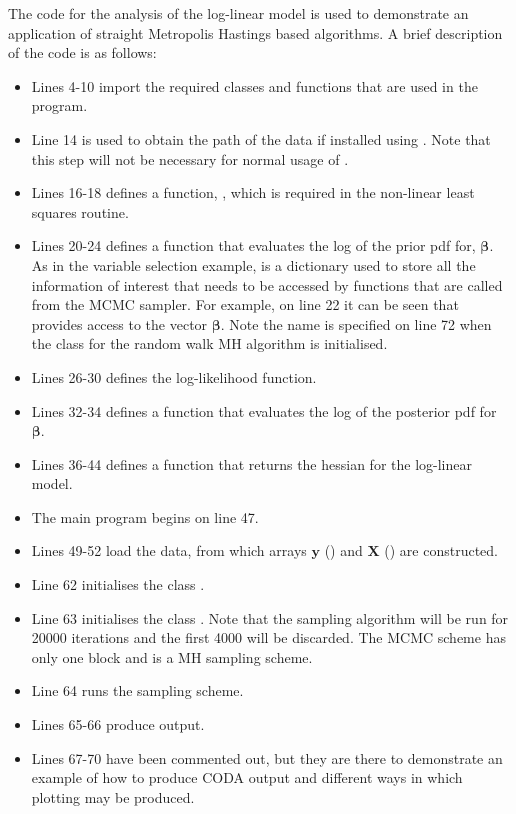 \documentclass[article]{jss}
\begin{document}
The code for the analysis of the log-linear model is used to
demonstrate an application of straight Metropolis Hastings based
algorithms.  A brief description of the code is as follows:
\begin{itemize}
\item Lines 4-10 import the required classes and functions that are
  used in the program.
\item Line 14 is used to obtain the path of the data if installed
  using . Note that this step will not be necessary for
  normal usage of .
\item Lines 16-18 defines a function, , which is
  required in the non-linear least squares routine.
\item Lines 20-24 defines a function that evaluates the log of the
  prior pdf for, $\bm{\beta}.$ As in the variable selection example,
   is a  dictionary used to store all the
  information of interest that needs to be accessed by functions that
  are called from the MCMC sampler. For example, on line 22 it can be
  seen that  provides access to the vector
  $\bm{\beta}.$ Note the name  is specified on line 72
  when the class for the random walk MH algorithm is initialised.
\item Lines 26-30 defines the log-likelihood function.
\item Lines 32-34 defines a function that evaluates the log of the
  posterior pdf for $\bm{\beta}.$
\item Lines 36-44 defines a function that returns the hessian for the
  log-linear model.
\item The main program begins on line 47.
\item Lines 49-52 load the data, from which arrays $\bm{y}$
  () and $\bm{X}$ () are constructed.
\item Line 62 initialises the class . 
\item Line 63 initialises the class  . Note that the
  sampling algorithm will be run for 20000 iterations and the first
  4000 will be discarded. The MCMC scheme has only one block and is a
  MH sampling scheme.
\item Line 64 runs the sampling scheme.
\item Lines 65-66 produce output.
\item Lines 67-70 have been commented out, but they are there to
  demonstrate an example of how to produce CODA output and different
  ways in which plotting may be produced.
\end{itemize}
\end{document}
